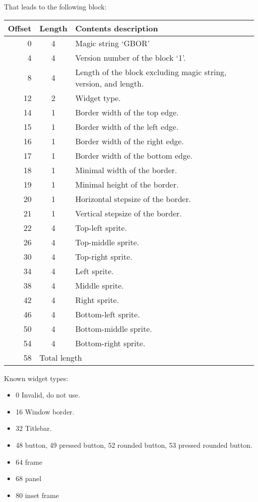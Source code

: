 \documentclass{article}
\begin{document}
That leads to the following block:
\begin{center}
\begin{tabular}{|r|c|l|} \hline
\textbf{Offset} & \textbf{Length} & \textbf{Contents description} \\ \hline
   0 &  4 & Magic string `GBOR' \\
   4 &  4 & Version number of the block `1'. \\
   8 &  4 & Length of the block excluding magic string, version, and length. \\
  12 &  2 & Widget type. \\
  14 &  1 & Border width of the top edge. \\
  15 &  1 & Border width of the left edge. \\
  16 &  1 & Border width of the right edge. \\
  17 &  1 & Border width of the bottom edge. \\
  18 &  1 & Minimal width of the border. \\
  19 &  1 & Minimal height of the border. \\
  20 &  1 & Horizontal stepsize of the border. \\
  21 &  1 & Vertical stepsize of the border. \\
  22 &  4 & Top-left sprite. \\
  26 &  4 & Top-middle sprite. \\
  30 &  4 & Top-right sprite. \\
  34 &  4 & Left sprite. \\
  38 &  4 & Middle sprite. \\
  42 &  4 & Right sprite. \\
  46 &  4 & Bottom-left sprite. \\
  50 &  4 & Bottom-middle sprite. \\
  54 &  4 & Bottom-right sprite. \\
  58 & \multicolumn{2}{l|}{Total length} \\ \hline
\end{tabular}
\end{center}

Known widget types:
\begin{itemize}
\item 0 Invalid, do not use.
\item 16 Window border.
\item 32 Titlebar.
\item 48 button,
      49 pressed button,
      52 rounded button,
      53 pressed rounded button.
\item 64 frame
\item 68 panel
\item 80 inset frame
\end{itemize}
\end{document}
